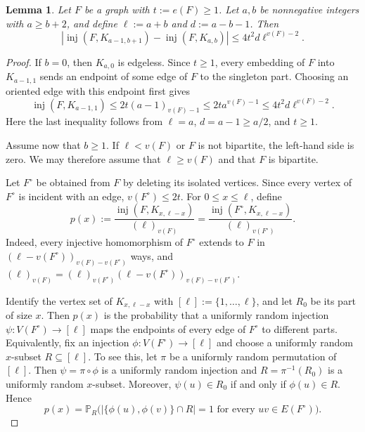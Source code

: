 \documentclass[11pt]{article}
\numberwithin{equation}{section}
\newtheorem{lemma}[theorem]{Lemma}
\theoremstyle{definition}
\theoremstyle{remark}
\newcommand{\inj}{\operatorname{inj}}
\newcommand{\Prb}{\mathbb P}
\begin{document}
\begin{lemma}
\label{lem:two-part-finite-difference}
Let $F$ be a graph with $t:=e(F)\ge 1$. Let $a,b$ be nonnegative integers with $a\ge b+2$, and define $\ell:=a+b$ and $d:=a-b-1$. Then
\[
\left|\inj(F,K_{a-1,b+1})-\inj(F,K_{a,b})\right|
\le 4t^2d\ell^{v(F)-2}.
\]
\end{lemma}

\begin{proof}
If $b=0$, then $K_{a,0}$ is edgeless. Since $t\ge1$, every embedding of $F$ into $K_{a-1,1}$ sends an endpoint of some edge of $F$ to the singleton part. Choosing an oriented edge with this endpoint first gives
\[
\inj(F,K_{a-1,1})
\le 2t(a-1)_{v(F)-1}
\le 2t a^{v(F)-1}
\le 4t^2d\ell^{v(F)-2}.
\]
Here the last inequality follows from $\ell=a$, $d=a-1\ge a/2$, and $t\ge1$.

Assume now that $b\ge1$. If $\ell<v(F)$ or $F$ is not bipartite, the left-hand side is zero. We may therefore assume that $\ell\ge v(F)$ and that $F$ is bipartite.

Let $F^\circ$ be obtained from $F$ by deleting its isolated vertices. Since every vertex of $F^\circ$ is incident with an edge, $v(F^\circ)\le2t$. For $0\le x\le\ell$, define
\[
p(x):=\frac{\inj(F,K_{x,\ell-x})}{(\ell)_{v(F)}}
=\frac{\inj(F^\circ,K_{x,\ell-x})}{(\ell)_{v(F^\circ)}}.
\]
Indeed, every injective homomorphism of $F^\circ$ extends to $F$ in $(\ell-v(F^\circ))_{v(F)-v(F^\circ)}$ ways, and
$(\ell)_{v(F)}=(\ell)_{v(F^\circ)}(\ell-v(F^\circ))_{v(F)-v(F^\circ)}$.

Identify the vertex set of $K_{x,\ell-x}$ with $[\ell]:=\{1,\ldots,\ell\}$, and let $R_0$ be its part of size $x$. Then $p(x)$ is the probability that a uniformly random injection $\psi:V(F^\circ)\to[\ell]$ maps the endpoints of every edge of $F^\circ$ to different parts. Equivalently, fix an injection $\phi:V(F^\circ)\to[\ell]$ and choose a uniformly random $x$-subset $R\subseteq[\ell]$. To see this, let $\pi$ be a uniformly random permutation of $[\ell]$. Then $\psi=\pi\circ\phi$ is a uniformly random injection and $R=\pi^{-1}(R_0)$ is a uniformly random $x$-subset. Moreover, $\psi(u)\in R_0$ if and only if $\phi(u)\in R$. Hence
\[
p(x)=\Prb_R\bigl(
|\{\phi(u),\phi(v)\}\cap R|=1
\text{ for every }uv\in E(F^\circ)
\bigr).
\]


\end{proof}
\end{document}
